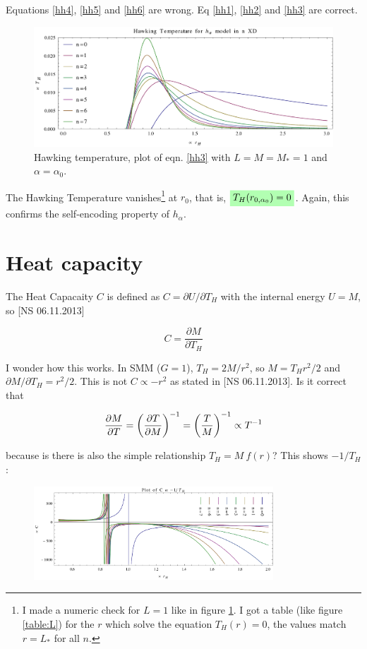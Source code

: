 \documentclass[10pt,a4paper, fleqn]{article}
\newcommand{\highlight}[1]{%
  \colorbox{green!30}{$\displaystyle#1$}}
\begin{document}
Equations \ref{hh4}, \ref{hh5} and \ref{hh6} are wrong. Eq \ref{hh1}, \ref{hh2} and \ref{hh3} are correct.

\begin{figure}[h]
\center%
\includegraphics[width=\textwidth]{mathematica/Hawking-Temp-Plot.pdf}
\caption{Hawking temperature, plot of eqn. \ref{hh3} with $L=M=M_*=1$ and $\alpha=\alpha_0$. %
}\label{fig:th}
\end{figure}

The Hawking Temperature vanishes\footnote{I made a numeric check for $L=1$ like in figure \ref{fig:th}. I got a table (like figure \ref{table:L}) for the $r$ which solve the equation $T_H(r)=0$, the values match $r=L_*$ for all $n$.} at $r_0$, that is, $\highlight{T_H(r_{0,\alpha_0})=0}$. Again, this confirms the self-encoding property of $h_\alpha$.

\section{Heat capacity}
The Heat Capacaity $C$ is defined as $C=\partial U/\partial T_H$ with the internal energy $U=M$, so [NS 06.11.2013]

\begin{equation}
C = \frac{\partial M}{\partial T_H}
\end{equation}

I wonder how this works. In SMM ($G=1$), $T_H = 2M / r^2$, so $M = T_H r^2 / 2$ and $\partial M/\partial T_H = r^2 / 2$. This is not $C \propto -r^2$ as stated in [NS 06.11.2013]. Is it correct that

\begin{equation}
\frac{\partial M}{\partial T} = \left( \frac{\partial T}{\partial M} \right)^{-1} = \left( \frac{T}{M} \right)^{-1} \propto T^{-1}
\end{equation}

because is there is also the simple relationship $T_H = M ~f(r)$? This shows $-1/T_H$:

\begin{figure}[h]
\center%
\includegraphics[width=0.8\textwidth]{mathematica/heat-capacity.pdf}
\end{figure}
\end{document}
